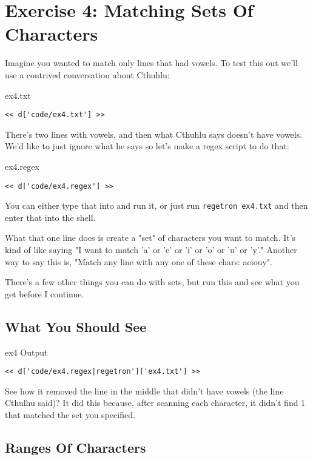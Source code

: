 \chapter{Exercise 4: Matching Sets Of Characters}

Imagine you wanted to match only lines that had vowels.  To test this out
we'll use a contrived conversation about Cthuhlu:

\begin{code}{ex4.txt}
\begin{Verbatim}
<< d['code/ex4.txt'] >>
\end{Verbatim}
\end{code}

There's two lines with vowels, and then what Cthuhlu says doesn't have vowels.
We'd like to just ignore what he says so let's make a regex script to do that:

\begin{code}{ex4.regex}
\begin{Verbatim}
<< d['code/ex4.regex'] >>
\end{Verbatim}
\end{code}

You can either type that into  and run it, or just run
\verb|regetron ex4.txt| and then enter that into the shell.

What that one line does is create a "set" of characters you want to match.
It's kind of like saying "I want to match 'a' or 'e' or 'i' or 'o' or 'u' or 'y'."
Another way to say this is, "Match any line with any one of these chars: aeiouy".

There's a few other things you can do with sets, but run this and see what you
get before I continue.

\section{What You Should See}

\begin{code}{ex4 Output}
\begin{Verbatim}
<< d['code/ex4.regex|regetron']['ex4.txt'] >>
\end{Verbatim}
\end{code}

See how it removed the line in the middle that didn't have vowels (the
line Cthulhu said)?  It did this because, after scanning each character,
it didn't find 1 that matched the set you specified.

\section{Ranges Of Characters}


